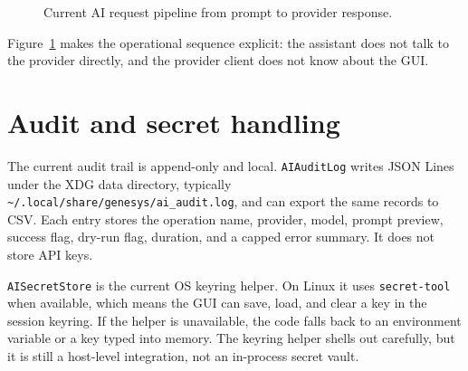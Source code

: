\begin{figure}[htbp]
\centering
\caption{Current AI request pipeline from prompt to provider response.}
\label{fig:ai-pipeline}
\end{figure}

Figure~\ref{fig:ai-pipeline} makes the operational sequence explicit: the assistant does not talk to the provider directly, and the provider client does not know about the GUI.

\section{Audit and secret handling}
\label{sec:ai-audit-and-secrets}

The current audit trail is append-only and local. \texttt{AIAuditLog} writes JSON Lines under the XDG data directory, typically \texttt{\textasciitilde/.local/share/genesys/ai\_audit.log}, and can export the same records to CSV. Each entry stores the operation name, provider, model, prompt preview, success flag, dry-run flag, duration, and a capped error summary. It does not store API keys.

\texttt{AISecretStore} is the current OS keyring helper. On Linux it uses \texttt{secret-tool} when available, which means the GUI can save, load, and clear a key in the session keyring. If the helper is unavailable, the code falls back to an environment variable or a key typed into memory. The keyring helper shells out carefully, but it is still a host-level integration, not an in-process secret vault.

